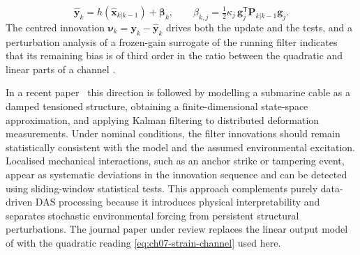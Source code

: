 \begin{equation}
\widehat{\mathbf{y}}_k=h(\widehat{\mathbf{x}}_{k|k-1})+\boldsymbol{\beta}_k,
\qquad
\beta_{k,j}=\tfrac12\kappa_j\,\mathbf{g}_j^{\mathsf T}\mathbf{P}_{k|k-1}\mathbf{g}_j .
\label{eq:ch07-second-order-prediction}
\end{equation}
The centred innovation $\boldsymbol{\nu}_k=\mathbf{y}_k-\widehat{\mathbf{y}}_k$ drives both the update and the tests, and a perturbation analysis of a frozen-gain surrogate of the running filter indicates that its remaining bias is of third order in the ratio between the quadratic and linear parts of a channel \cite{oliva_quadratic_ejc_2026}.


In a recent paper~\cite{fioravanti_cable_med_2026} this direction is followed by modelling a submarine cable as a damped tensioned structure, obtaining a finite-dimensional state-space approximation, and applying Kalman filtering to distributed deformation measurements. Under nominal conditions, the filter innovations should remain statistically consistent with the model and the assumed environmental excitation. Localised mechanical interactions, such as an anchor strike or tampering event, appear as systematic deviations in the innovation sequence and can be detected using sliding-window statistical tests. This approach complements purely data-driven DAS processing because it introduces physical interpretability and separates stochastic environmental forcing from persistent structural perturbations. The journal paper under review \cite{oliva_quadratic_ejc_2026} replaces the linear output model of \cite{fioravanti_cable_med_2026} with the quadratic reading \eqref{eq:ch07-strain-channel} used here.
